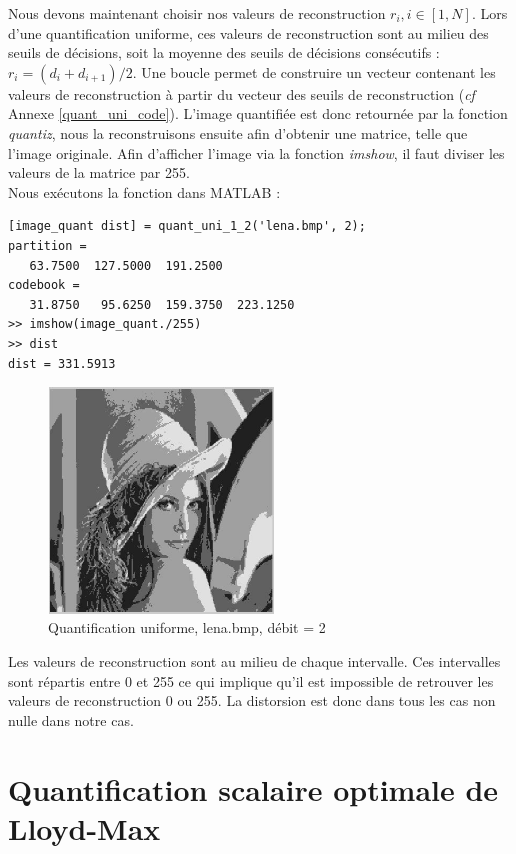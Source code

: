 \documentclass[a4paper, 12pt]{article}
\begin{document}
Nous devons maintenant choisir nos valeurs de reconstruction $r_i, i\in[1, N]$. Lors d'une quantification uniforme, ces valeurs de reconstruction sont au milieu des seuils de décisions, soit la moyenne des seuils de décisions consécutifs : $r_i = (d_i + d_{i+1})/2$. Une boucle permet de construire un vecteur contenant les valeurs de reconstruction à partir du vecteur des seuils de reconstruction (\textit{cf} Annexe \ref{quant_uni_code}). L'image quantifiée est donc retournée par la fonction \textit{quantiz}, nous la reconstruisons ensuite afin d'obtenir une matrice, telle que l'image originale. Afin d'afficher l'image via la fonction \textit{imshow}, il faut diviser les valeurs de la matrice par 255. \\

Nous exécutons la fonction dans MATLAB : 
\begin{verbatim}
[image_quant dist] = quant_uni_1_2('lena.bmp', 2);
partition =
   63.7500  127.5000  191.2500
codebook =
   31.8750   95.6250  159.3750  223.1250
>> imshow(image_quant./255)
>> dist
dist = 331.5913
\end{verbatim}

\begin{figure}[H]
	\centering
		\includegraphics[width=6cm, height=6cm]{../lena_quant_4_niveaux.jpg}
	\caption{Quantification uniforme, lena.bmp, débit = 2}
	\label{fig:lena_quant_4_niveaux}
\end{figure}

Les valeurs de reconstruction sont au milieu de chaque intervalle. Ces intervalles sont répartis entre 0 et 255 ce qui implique qu'il est impossible de retrouver les valeurs de reconstruction 0 ou 255. La distorsion est donc dans tous les cas non nulle dans notre cas. \\

\section{Quantification scalaire optimale de Lloyd-Max}
\end{document}
